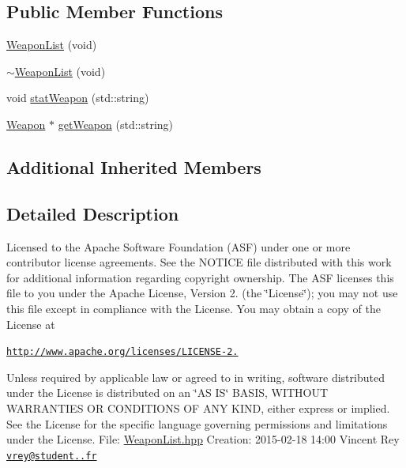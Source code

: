 \subsection*{Public Member Functions}
\begin{DoxyCompactItemize}
\item 
\hyperlink{class_weapon_list_ac3a994cd2844ac00fcf09011f4209f48}{Weapon\-List} (void)
\item 
\hyperlink{class_weapon_list_a44f72440d8a4586b19e4b60d308b2e51}{$\sim$\-Weapon\-List} (void)
\item 
void \hyperlink{class_weapon_list_ad39bd93b72f73eb7e69388dd5d4bfac2}{stat\-Weapon} (std\-::string)
\item 
\hyperlink{class_weapon}{Weapon} $\ast$ \hyperlink{class_weapon_list_a97b9173cefa20573ed27d52d58d1292e}{get\-Weapon} (std\-::string)
\end{DoxyCompactItemize}
\subsection*{Additional Inherited Members}


\subsection{Detailed Description}
Licensed to the Apache Software Foundation (A\-S\-F) under one or more contributor license agreements. See the N\-O\-T\-I\-C\-E file distributed with this work for additional information regarding copyright ownership. The A\-S\-F licenses this file to you under the Apache License, Version 2. (the \char`\"{}\-License\char`\"{}); you may not use this file except in compliance with the License. You may obtain a copy of the License at

\href{http://www.apache.org/licenses/LICENSE-2.0}{\tt http\-://www.\-apache.\-org/licenses/\-L\-I\-C\-E\-N\-S\-E-\/2.}

Unless required by applicable law or agreed to in writing, software distributed under the License is distributed on an \char`\"{}\-A\-S I\-S\char`\"{} B\-A\-S\-I\-S, W\-I\-T\-H\-O\-U\-T W\-A\-R\-R\-A\-N\-T\-I\-E\-S O\-R C\-O\-N\-D\-I\-T\-I\-O\-N\-S O\-F A\-N\-Y K\-I\-N\-D, either express or implied. See the License for the specific language governing permissions and limitations under the License. File\-: \hyperlink{_weapon_list_8hpp}{Weapon\-List.\-hpp} Creation\-: 2015-\/02-\/18 14\-:00 Vincent Rey \href{mailto:vrey@student.42.fr}{\tt vrey@student..\-fr} 

